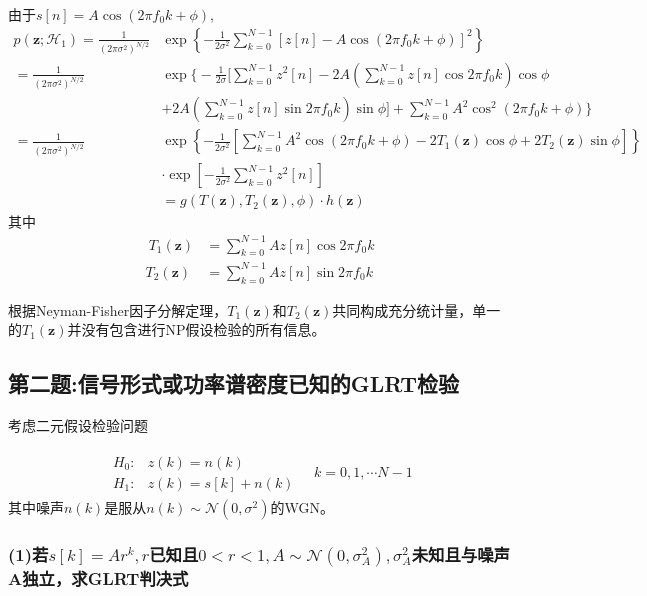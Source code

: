 \documentclass[fontset=windows]{article}
\numberwithin{figure}{section}
\begin{document}
由于\(s[n]=A\cos (2\pi f_0 k+\phi)\),
\begin{align*}
	p(\mathbf{z};\mathcal{H}_1)
	=  \frac{1}{(2\pi \sigma^2)^{N/2}}
	 & \exp\left\{-\frac{1}{2\sigma^2}\sum_{k=0}^{N-1}[z[n]-A\cos (2\pi f_0 k+\phi)]^2 \right\}                                                        \\
	=  \frac{1}{(2\pi \sigma^2)^{N/2}}
	 & \exp\bigg\{-\frac{1}{2\sigma}\bigg[\sum_{k=0}^{N-1}z^2[n]-2A\left(\sum_{k=0}^{N-1}z[n]\cos2\pi f_0 k\right)\cos \phi                            \\
	 & +2A\left(\sum_{k=0}^{N-1}z[n]\sin 2\pi f_0 k\right)\sin \phi\bigg] +\sum_{k=0}^{N-1}A^2\cos^2 (2\pi f_0 k +\phi)\bigg\}                         \\
	= \frac{1}{(2\pi \sigma^2)^{N/2}}
	 & \exp\left\{-\frac{1}{2\sigma^2}\left[\sum_{k=0}^{N-1}A^2\cos(2\pi f_0 k+\phi)-2T_1(\mathbf{z})\cos\phi+2T_2(\mathbf{z})\sin \phi\right]\right\} \\
	 & \cdot \exp\left[-\frac{1}{2\sigma^2}\sum_{k=0}^{N-1}z^2[n]\right]                                                                               \\
	 & =g(T(\mathbf{z}),T_2(\mathbf{z}),\phi)\cdot h(\mathbf{z})
\end{align*}
其中
\begin{align*}\
	T_1(\mathbf{z}) & =\sum_{k=0}^{N-1}Az[n]\cos2\pi f_0 k \\
	T_2(\mathbf{z}) & =\sum_{k=0}^{N-1}Az[n]\sin2\pi f_0 k
\end{align*}

根据Neyman-Fisher因子分解定理，\(T_1(\mathbf{z})\)和\(T_2(\mathbf{z})\)共同构成充分统计量，单一的\(T_1(\mathbf{z})\)并没有包含进行NP假设检验的所有信息。

\subsection{第二题:信号形式或功率谱密度已知的GLRT检验}
考虑二元假设检验问题

\begin{align*}
	\begin{matrix}
		H_0: & z(k)=n(k)      \\
		H_1: & z(k)=s[k]+n(k)
	\end{matrix}\quad k=0,1,\cdots N-1
\end{align*}
其中噪声\(n(k)\)是服从\(n(k)\sim \mathcal{N}(0,\sigma^2)\)的WGN。

\subsubsection*{(1)若\(s[k]=Ar^k,r\)已知且\(0<r<1,A\sim \mathcal{N}(0,\sigma^2_A),\sigma^2_A\)未知且与噪声A独立，求GLRT判决式}
\end{document}
